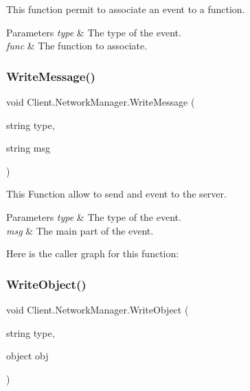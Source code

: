 This function permit to associate an event to a function. 
\begin{DoxyParams}{Parameters}
{\em type} & The type of the event. \\
\hline
{\em func} & The function to associate. \\
\hline
\end{DoxyParams}
\mbox{\label{class_client_1_1_network_manager_ab07955561eb46316ddf2c1e3f4d72670}} 
\subsubsection{\texorpdfstring{Write\+Message()}{WriteMessage()}}
{\footnotesize\ttfamily void Client.\+Network\+Manager.\+Write\+Message (\begin{DoxyParamCaption}\item[{string}]{type,  }\item[{string}]{msg }\end{DoxyParamCaption})\hspace{0.3cm}{\ttfamily [inline]}}

This Function allow to send and event to the server. 
\begin{DoxyParams}{Parameters}
{\em type} & The type of the event. \\
\hline
{\em msg} & The main part of the event. \\
\hline
\end{DoxyParams}
Here is the caller graph for this function\+:
\mbox{\label{class_client_1_1_network_manager_a94eba16a4e3153c3676982aa4fec97c8}} 
\subsubsection{\texorpdfstring{Write\+Object()}{WriteObject()}}
{\footnotesize\ttfamily void Client.\+Network\+Manager.\+Write\+Object (\begin{DoxyParamCaption}\item[{string}]{type,  }\item[{object}]{obj }\end{DoxyParamCaption})\hspace{0.3cm}{\ttfamily [inline]}}

